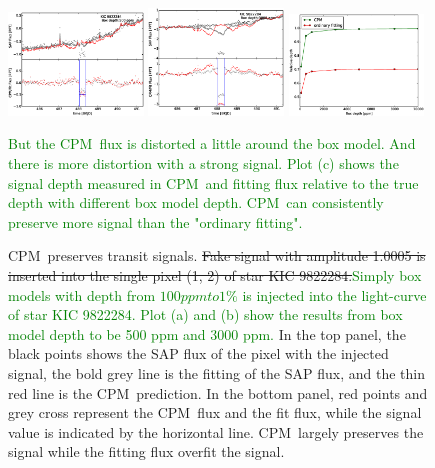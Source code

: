 \documentclass[12pt, preprint]{aastex}
\newcommand{\name}{CPM}
\newcommand{\revise}[1]{\textcolor{green}{#1}}
\newcommand{\remove}[1]{\sout{#1}}
\begin{document}
\begin{figure}[p]
\begin{center}
\includegraphics[width=0.32\textwidth]{f4a}
\includegraphics[width=0.32\textwidth]{f4b}
\includegraphics[width=0.32\textwidth]{f4c}
\end{center}
\caption{
  \label{distortion} 
  \name\ preserves transit signals.
  \remove{Fake signal with amplitude 1.0005 is inserted into the single pixel (1, 2) of star KIC 9822284.}\revise{Simply box models with depth from $100 ppm to 1\%$ is injected into the light-curve of star KIC 9822284. Plot (a) and (b) show the results from box model depth to be 500 ppm and 3000 ppm.}
  In the top panel, the black points shows the SAP flux of the pixel with the injected signal, the bold grey line is the fitting of the SAP flux, and the thin red line is the \name\ prediction. 
  In the bottom panel, red points and grey cross represent the \name\ flux and the fit flux, while the signal value is indicated by the horizontal line. 
  \name\ largely preserves the signal while the fitting flux overfit the signal.} 
  \revise{But the \name\ flux is distorted a little around the box model. 
  And there is more distortion with a strong signal.
  Plot (c) shows the signal depth measured in \name\ and fitting flux relative to the true depth with different box model depth. \name\ can consistently preserve more signal than the "ordinary fitting".}
\end{figure}
\end{document}
